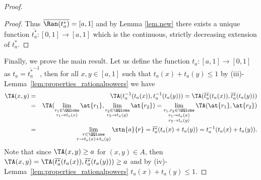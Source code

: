 \begin{proof}
\begin{proof}
		Thus $\overline{\Ran (t^*_a)} = [a,1]$ and by Lemma \ref{lem.new} there exists  a unique function $ \overline{t^*_a} : [0,1] \to [a,1]$  which is the continuous, strictly decreasing extension of $t^*_a$.
	\end{proof}
	Finally, we prove the main result. Let us define the function $t_a: [a,1] \to [0,1]$ as $t_a = \overline{t^*_a}^{-1}$, then for all $x,y \in [a,1]$ such that $t_a(x)+t_a(y) \leq 1$ by (iii)-Lemma~\ref{lem:properties_rationalpowers} we have
	\begin{eqnarray*}
		\TA(x,y) &=& \TA(t_a^{-1}(t_a(x)),t_a^{-1}(t_a(y))) = \TA(\overline{t^*_a}(t_a(x)),\overline{t^*_a}(t_a(y))) \\
		&=& \TA(\lim\limits_{\substack{r_1 \in \QQlone \\ r_1\rightarrow t_a(x)}} \at{r_1},\lim\limits_{\substack{r_2\in \QQlone \\ r_2\rightarrow t_a(y)}} \at{r_2}) = \lim\limits_{\substack{r_1,r_2 \in \QQlone \\ r_1\rightarrow t_a(x) \\ r_2\rightarrow t_a(y)}}\TA( \at{r_1}, \at{r_2})\\
		&=&\lim\limits_{\substack{r\in \QQlone \\ r\rightarrow t_a(x) +t_a(y)}}\xtn{a}{r} = \overline{t^*_a}(t_a(x)+t_a(y)) = t_a^{-1}(t_a(x)+t_a(y)).
	\end{eqnarray*}
	Note that since $\TA(x,y) \geq a$ for $(x,y) \in A$, then $\TA(x,y) =\TA(\overline{t^*_a}(t_a(x)),\overline{t^*_a}(t_a(y))) \geq a$ and by (iv)-Lemma~\ref{lem:properties_rationalpowers} $t_a(x)+t_a(y) \leq 1$.
	

\end{proof}
